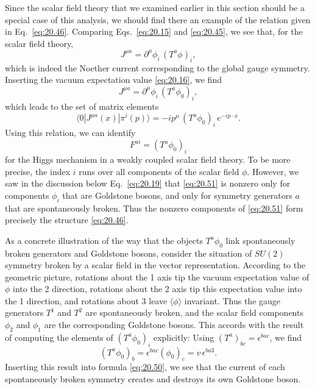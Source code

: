 Since the scalar field theory that we examined earlier in this section should
be a special case of this analysis, we should find there an example of the
relation given in Eq.~\eqref{eq:20.46}.  Comparing Eqs.~\eqref{eq:20.15} and
\eqref{eq:20.45}, we see that, for the scalar field theory,
\begin{equation}
  J^{\mu a} = \partial^\mu\phi_i\,(T^a\phi)_i ,
  \label{eq:20.48}
\end{equation}
which is indeed the Noether current corresponding to the global gauge
symmetry.  Inserting the vacuum expectation value \eqref{eq:20.16}, we find
\begin{equation}
  J^{\mu a} = \partial^\mu\phi_i\,(T^a\phi_0)_i ,
  \label{eq:20.49}
\end{equation}
which leads to the set of matrix elements
\begin{equation}
  \langle 0|J^{\mu a}(x)|\pi^i(p)\rangle = -ip^\mu\,(T^a\phi_0)_i\,
    e^{-ip\cdot x} .
  \label{eq:20.50}
\end{equation}
Using this relation, we can identify
\begin{equation}
  F^{ai} = (T^a\phi_0)_i
  \label{eq:20.51}
\end{equation}
for the Higgs mechanism in a weakly coupled scalar field theory.  To be more
precise, the index $i$ runs over all components of the scalar field $\phi$.
However, we saw in the discussion below Eq.~\eqref{eq:20.19} that
\eqref{eq:20.51} is nonzero only for components $\phi_i$ that are Goldstone
bosons, and only for symmetry generators $a$ that are spontaneously broken.
Thus the nonzero components of \eqref{eq:20.51} form precisely the structure
\eqref{eq:20.46}.

As a concrete illustration of the way that the objects $T^a\phi_0$ link
spontaneously broken generators and Goldstone bosons, consider the situation
of $SU(2)$ symmetry broken by a scalar field in the vector representation.
According to the geometric picture, rotations about the 1 axis tip the vacuum
expectation value of $\phi$ into the 2 direction, rotations about the 2 axis
tip this expectation value into the 1 direction, and rotations about 3 leave
$\langle\phi\rangle$ invariant.  Thus the gauge generators $T^1$ and $T^2$ are
spontaneously broken, and the scalar field components $\phi_2$ and $\phi_1$
are the corresponding Goldstone bosons.  This accords with the result of
computing the elements of $(T^a\phi_0)_i$ explicitly: Using
$(T^a)_{bc} = \epsilon^{bac}$, we find
\begin{equation}
  (T^a\phi_0)_b = \epsilon^{bac}(\phi_0)_c = v\,\epsilon^{ba3} .
  \label{eq:20.52}
\end{equation}
Inserting this result into formula \eqref{eq:20.50}, we see that the current
of each spontaneously broken symmetry creates and destroys its own Goldstone
boson.

